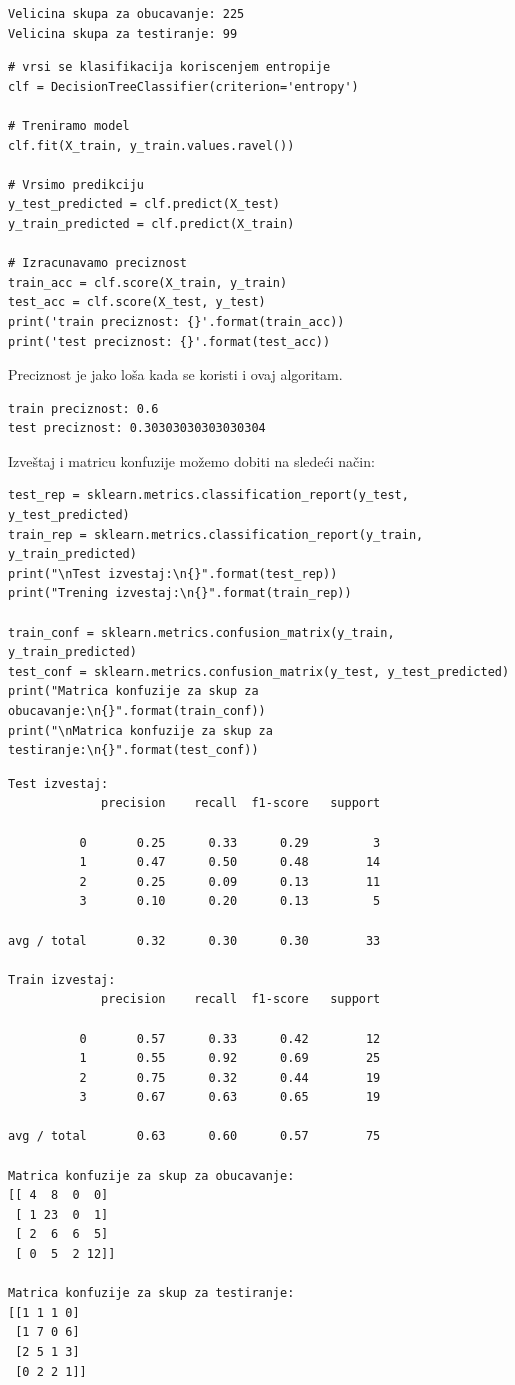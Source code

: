 \documentclass[12pt,a4paper]{article}
\begin{document}
\begin{verbatim}
Velicina skupa za obucavanje: 225
Velicina skupa za testiranje: 99
\end{verbatim}

\begin{lstlisting}
# vrsi se klasifikacija koriscenjem entropije
clf = DecisionTreeClassifier(criterion='entropy')

# Treniramo model
clf.fit(X_train, y_train.values.ravel())

# Vrsimo predikciju
y_test_predicted = clf.predict(X_test)
y_train_predicted = clf.predict(X_train)

# Izracunavamo preciznost
train_acc = clf.score(X_train, y_train)
test_acc = clf.score(X_test, y_test)
print('train preciznost: {}'.format(train_acc))
print('test preciznost: {}'.format(test_acc))
\end{lstlisting}

Preciznost je jako lo\v sa kada se koristi i ovaj algoritam.
\begin{verbatim}
train preciznost: 0.6
test preciznost: 0.30303030303030304
\end{verbatim}

Izve\v staj i matricu konfuzije mo\v zemo dobiti na slede\' ci na\v cin:

\begin{lstlisting}
test_rep = sklearn.metrics.classification_report(y_test, y_test_predicted)
train_rep = sklearn.metrics.classification_report(y_train, y_train_predicted)
print("\nTest izvestaj:\n{}".format(test_rep))
print("Trening izvestaj:\n{}".format(train_rep))

train_conf = sklearn.metrics.confusion_matrix(y_train, y_train_predicted)
test_conf = sklearn.metrics.confusion_matrix(y_test, y_test_predicted)
print("Matrica konfuzije za skup za obucavanje:\n{}".format(train_conf))
print("\nMatrica konfuzije za skup za testiranje:\n{}".format(test_conf))
\end{lstlisting}

\begin{verbatim}
Test izvestaj:
             precision    recall  f1-score   support

          0       0.25      0.33      0.29         3
          1       0.47      0.50      0.48        14
          2       0.25      0.09      0.13        11
          3       0.10      0.20      0.13         5

avg / total       0.32      0.30      0.30        33

Train izvestaj:
             precision    recall  f1-score   support

          0       0.57      0.33      0.42        12
          1       0.55      0.92      0.69        25
          2       0.75      0.32      0.44        19
          3       0.67      0.63      0.65        19

avg / total       0.63      0.60      0.57        75

Matrica konfuzije za skup za obucavanje:
[[ 4  8  0  0]
 [ 1 23  0  1]
 [ 2  6  6  5]
 [ 0  5  2 12]]

Matrica konfuzije za skup za testiranje:
[[1 1 1 0]
 [1 7 0 6]
 [2 5 1 3]
 [0 2 2 1]]
\end{verbatim}
\end{document}
